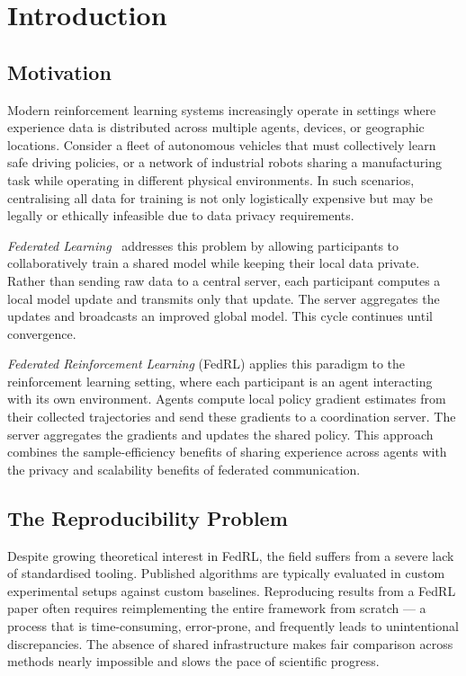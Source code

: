 
\chapter{Introduction}\label{ch:introduction}

\section*{Motivation}

Modern reinforcement learning systems increasingly operate in settings where
experience data is distributed across multiple agents, devices, or geographic
locations. Consider a fleet of autonomous vehicles that must collectively learn
safe driving policies, or a network of industrial robots sharing a manufacturing
task while operating in different physical environments. In such scenarios,
centralising all data for training is not only logistically expensive but may
be legally or ethically infeasible due to data privacy requirements.

\emph{Federated Learning}~\cite{mcmahan2017fedavg} addresses this problem by
allowing participants to collaboratively train a shared model while keeping their
local data private. Rather than sending raw data to a central server, each
participant computes a local model update and transmits only that update. The
server aggregates the updates and broadcasts an improved global model. This
cycle continues until convergence.

\emph{Federated Reinforcement Learning} (FedRL) applies this paradigm to the
reinforcement learning setting, where each participant is an agent interacting
with its own environment. Agents compute local policy gradient estimates from
their collected trajectories and send these gradients to a coordination server.
The server aggregates the gradients and updates the shared policy. This approach
combines the sample-efficiency benefits of sharing experience across agents with
the privacy and scalability benefits of federated communication.

\section*{The Reproducibility Problem}

Despite growing theoretical interest in FedRL, the field suffers from a severe
lack of standardised tooling. Published algorithms are typically evaluated in
custom experimental setups against custom baselines. Reproducing results from a
FedRL paper often requires reimplementing the entire framework from scratch --- a
process that is time-consuming, error-prone, and frequently leads to unintentional
discrepancies. The absence of shared infrastructure makes fair comparison across
methods nearly impossible and slows the pace of scientific progress.

